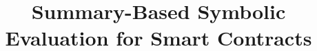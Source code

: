 \documentclass[sigconf,review,anonymous]{acmart}
\begin{document}
%
\title{Summary-Based Symbolic Evaluation for Smart Contracts}
%
%
%
%
%


\maketitle              %
%


%
%
%










%
%
%

% 
%

\end{document}
